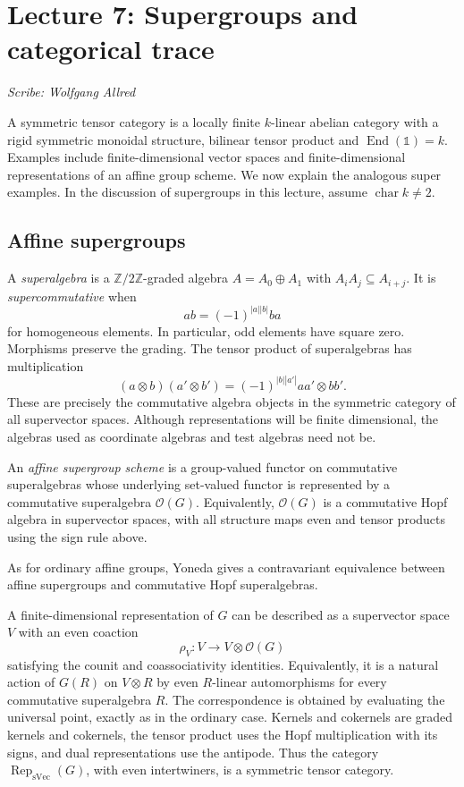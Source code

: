 \section{Lecture 7: Supergroups and categorical trace}\label{lec7}
\noindent\textit{Scribe: Wolfgang Allred}


A symmetric tensor category is a locally finite $k$-linear abelian category with a rigid symmetric monoidal structure, bilinear tensor product and $\operatorname{End}(\mathbb{1})=k$. Examples include finite-dimensional vector spaces and finite-dimensional representations of an affine group scheme. We now explain the analogous super examples. In the discussion of supergroups in this lecture, assume $\operatorname{char}k\ne2$.

\subsection*{Affine supergroups}
A \emph{superalgebra} is a $\mathbb Z/2\mathbb Z$-graded algebra $A=A_0\oplus A_1$ with $A_iA_j\subseteq A_{i+j}$. It is \emph{supercommutative} when
\[
 ab=(-1)^{|a||b|}ba
\]
for homogeneous elements. In particular, odd elements have square zero. Morphisms preserve the grading. The tensor product of superalgebras has multiplication
\[
 (a\otimes b)(a'\otimes b')=(-1)^{|b||a'|}aa'\otimes bb'.
\]
These are precisely the commutative algebra objects in the symmetric category of all supervector spaces. Although representations will be finite dimensional, the algebras used as coordinate algebras and test algebras need not be.

\begin{definition}
An \emph{affine supergroup scheme} is a group-valued functor on commutative superalgebras whose underlying set-valued functor is represented by a commutative superalgebra $\mathcal O(G)$. Equivalently, $\mathcal O(G)$ is a commutative Hopf algebra in supervector spaces, with all structure maps even and tensor products using the sign rule above.
\end{definition}
As for ordinary affine groups, Yoneda gives a contravariant equivalence between affine supergroups and commutative Hopf superalgebras.

A finite-dimensional representation of $G$ can be described as a supervector space $V$ with an even coaction
\[
 \rho_V:V\longrightarrow V\otimes\mathcal O(G)
\]
satisfying the counit and coassociativity identities. Equivalently, it is a natural action of $G(R)$ on $V\otimes R$ by even $R$-linear automorphisms for every commutative superalgebra $R$. The correspondence is obtained by evaluating the universal point, exactly as in the ordinary case. Kernels and cokernels are graded kernels and cokernels, the tensor product uses the Hopf multiplication with its signs, and dual representations use the antipode. Thus the category $\operatorname{Rep}_{\mathrm{sVec}}(G)$, with even intertwiners, is a symmetric tensor category.

